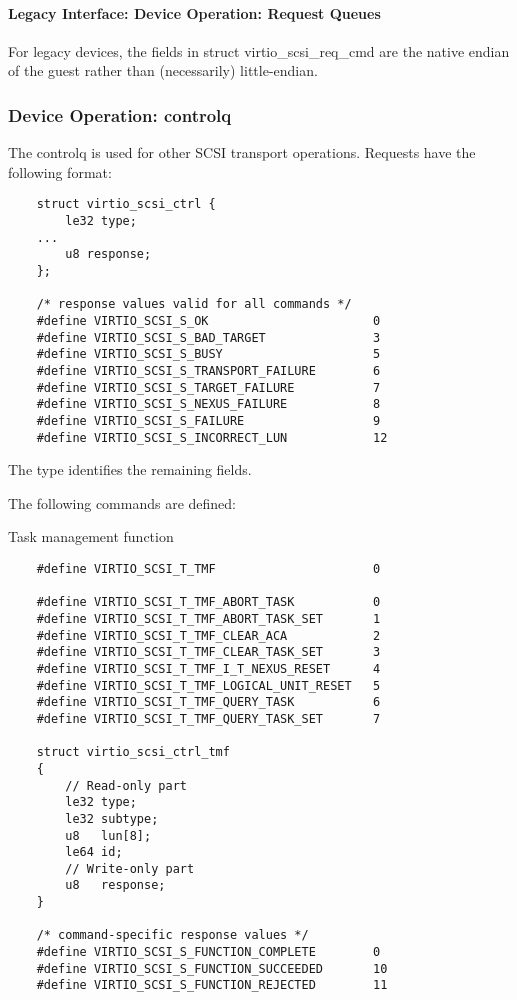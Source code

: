\paragraph{Legacy Interface: Device Operation: Request Queues}\label{sec:Device Types / SCSI Host Device / Device Operation / Device Operation: Request Queues / Legacy Interface: Device Operation: Request Queues}
For legacy devices, the fields in struct virtio_scsi_req_cmd are the
native endian of the guest rather than (necessarily) little-endian.

\subsubsection{Device Operation: controlq}\label{sec:Device Types / SCSI Host Device / Device Operation / Device Operation: controlq}

The controlq is used for other SCSI transport operations.
Requests have the following format:

\begin{lstlisting}
	struct virtio_scsi_ctrl {
		le32 type;
	...
		u8 response;
	};

	/* response values valid for all commands */
	#define VIRTIO_SCSI_S_OK                       0
	#define VIRTIO_SCSI_S_BAD_TARGET               3
	#define VIRTIO_SCSI_S_BUSY                     5
	#define VIRTIO_SCSI_S_TRANSPORT_FAILURE        6
	#define VIRTIO_SCSI_S_TARGET_FAILURE           7
	#define VIRTIO_SCSI_S_NEXUS_FAILURE            8
	#define VIRTIO_SCSI_S_FAILURE                  9
	#define VIRTIO_SCSI_S_INCORRECT_LUN            12
\end{lstlisting}

The type identifies the remaining fields.

The following commands are defined:

  Task management function
\begin{lstlisting}
	#define VIRTIO_SCSI_T_TMF                      0

	#define VIRTIO_SCSI_T_TMF_ABORT_TASK           0
	#define VIRTIO_SCSI_T_TMF_ABORT_TASK_SET       1
	#define VIRTIO_SCSI_T_TMF_CLEAR_ACA            2
	#define VIRTIO_SCSI_T_TMF_CLEAR_TASK_SET       3
	#define VIRTIO_SCSI_T_TMF_I_T_NEXUS_RESET      4
	#define VIRTIO_SCSI_T_TMF_LOGICAL_UNIT_RESET   5
	#define VIRTIO_SCSI_T_TMF_QUERY_TASK           6
	#define VIRTIO_SCSI_T_TMF_QUERY_TASK_SET       7

	struct virtio_scsi_ctrl_tmf
	{
		// Read-only part
		le32 type;
		le32 subtype;
		u8   lun[8];
		le64 id;
		// Write-only part
		u8   response;
	}

	/* command-specific response values */
	#define VIRTIO_SCSI_S_FUNCTION_COMPLETE        0
	#define VIRTIO_SCSI_S_FUNCTION_SUCCEEDED       10
	#define VIRTIO_SCSI_S_FUNCTION_REJECTED        11
\end{lstlisting}

